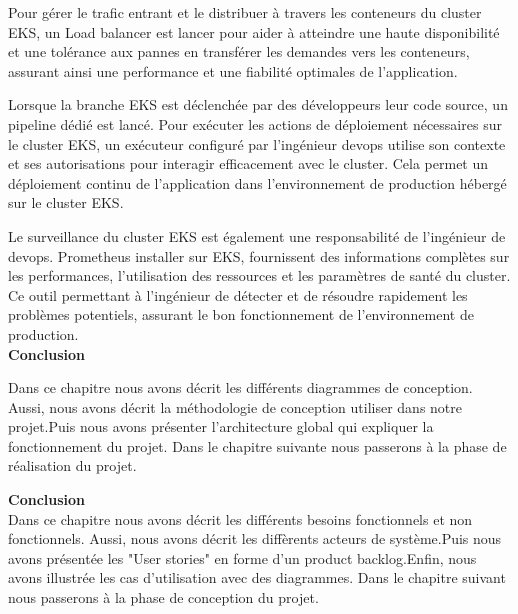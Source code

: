 Pour gérer le trafic entrant et le distribuer à travers les conteneurs du cluster EKS, un Load balancer est lancer pour aider à atteindre une haute disponibilité et une tolérance aux pannes en transférer les demandes vers les conteneurs, assurant ainsi une performance et une fiabilité optimales de l’application.
\\[0.01cm]
\indent
{}  
Lorsque la branche EKS est déclenchée par des développeurs  leur code source, un pipeline dédié est lancé. Pour exécuter les actions de déploiement nécessaires sur le cluster EKS, un exécuteur configuré par l’ingénieur devops utilise son contexte et ses autorisations pour interagir efficacement avec le cluster. Cela permet un déploiement continu de l’application dans l’environnement de production hébergé sur le cluster EKS.
\\[0.01cm]
\indent
{}  
Le surveillance du cluster EKS est également une responsabilité de l’ingénieur de devops. Prometheus installer sur EKS, fournissent des informations complètes sur les performances, l’utilisation des ressources et les paramètres de santé du cluster. Ce outil permettant à l’ingénieur de détecter et de résoudre rapidement les problèmes potentiels, assurant le bon fonctionnement de l’environnement de production.\\[0.3cm]

\textbf{\huge Conclusion}
  
  Dans ce chapitre nous avons décrit les différents diagrammes de conception. Aussi, nous avons décrit la méthodologie de conception utiliser dans notre projet.Puis nous avons présenter l'architecture global qui expliquer la fonctionnement du projet. Dans le chapitre suivante nous passerons à la phase de réalisation du projet.

          
\textbf{\huge Conclusion}\\[0.5cm] 

Dans ce chapitre nous avons décrit les différents besoins fonctionnels et non fonctionnels. Aussi, nous avons décrit les diffèrents acteurs de système.Puis nous avons présentée les "User stories" en forme d'un product backlog.Enfin, nous avons illustrée les cas d'utilisation avec des diagrammes. Dans le chapitre suivant nous passerons à la phase de conception du projet.


